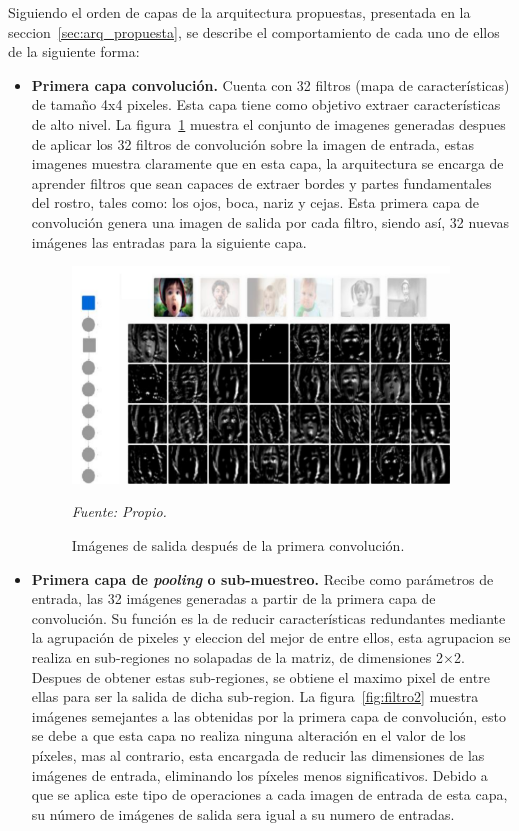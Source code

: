 Siguiendo el orden de capas de la arquitectura propuestas, presentada en la seccion~\ref{sec:arq_propuesta}, se describe el comportamiento de cada uno de ellos de la siguiente forma: 
\begin{itemize}
\item
{
\textbf{Primera capa convolución.} Cuenta con 32 filtros (mapa de características) de tamaño 4x4 pixeles. Esta capa tiene como objetivo extraer características de alto nivel. La figura~\ref{fig:filtro1} muestra el conjunto de imagenes generadas despues de aplicar los 32 filtros de convolución sobre la imagen de entrada, estas imagenes muestra claramente que en esta capa, la arquitectura se encarga de aprender filtros que sean capaces de extraer bordes y partes fundamentales del rostro, tales como: los ojos, boca, nariz y cejas. Esta primera capa de convolución genera una imagen de salida por cada filtro, siendo así, 32 nuevas imágenes las entradas para la siguiente capa. 

\begin{figure}[H]
		\centering
		\includegraphics[width=100mm]{./Imagenes/filtro1.png}
		\caption{Imágenes de salida después de la primera convolución.}
		\vspace{0.15cm}
		\textit{Fuente: Propio.}
		\label{fig:filtro1}
\end{figure}
}

\item
{
\textbf{Primera capa de \textit{pooling} o sub-muestreo.} Recibe como parámetros de entrada, las 32 imágenes generadas a partir de la primera capa de convolución. Su función es la de reducir características redundantes mediante la agrupación de pixeles y eleccion del mejor de entre ellos, esta agrupacion se realiza en sub-regiones no solapadas de la matriz, de dimensiones 2$\times$2. Despues de obtener estas sub-regiones, se obtiene el maximo pixel de entre ellas para ser la salida de dicha sub-region. La figura~\ref{fig:filtro2} muestra imágenes semejantes a las obtenidas por la primera capa de convolución, esto se debe a que esta capa no realiza ninguna alteración en el valor de los píxeles, mas al contrario, esta encargada de reducir las dimensiones de las imágenes de entrada, eliminando los píxeles menos significativos. Debido a que se aplica este tipo de operaciones a cada imagen de entrada de esta capa, su número de imágenes de salida sera igual a su numero de entradas.

}
\end{itemize}
